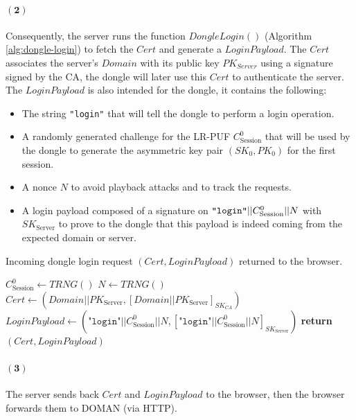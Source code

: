 \paragraph{$\boldsymbol{(2)}$} Consequently, the server runs the function $DongleLogin()$ (Algorithm \ref{alg:dongle-login}) to fetch the $Cert$ and generate a $LoginPayload$. The $Cert$ associates the server's $Domain$ with its public key $PK_{Server}$ using a signature signed by the CA, the dongle will later use this $Cert$ to authenticate the server. The $LoginPayload$ is also intended for the dongle, it contains the following:
\begin{itemize}
    \item The string \verb|"login"| that will tell the dongle to perform a login operation.
    \item A randomly generated challenge for the LR-PUF $C_\text{Session}^0$ that will be used by the dongle to generate the asymmetric key pair $(SK_0,PK_0)$ for the first session.
    \item A nonce $N$ to avoid playback attacks and to track the requests.
    \item A login payload composed of a signature on $\verb|"login"|||C_\text{Session}^0||N$ with $SK_\text{Server}$ to prove to the dongle that this payload is indeed coming from the expected domain or server.
\end{itemize}
\begin{algorithm}[ht!]
\caption{$DongleLogin()$}
\begin{algorithmic}[1]
    \Require Incoming dongle login request
    \Ensure  $(\mathit{Cert}, \mathit{LoginPayload})$ returned to the browser.

    \State $C^0_{\text{Session}} \leftarrow TRNG()$
    \State $N \leftarrow TRNG()$
    \State $Cert \leftarrow (Domain||PK_\text{Server},[Domain||PK_\text{Server}]_{SK_{CA}})$
    \State $\mathit{LoginPayload} \leftarrow
            (\texttt{"login"} || C^0_{\text{Session}} || N,
            [\texttt{"login"} || C^0_{\text{Session}} || N]_{\mathit{SK}_{\text{Server}}})$
    \State \textbf{return} $(\mathit{Cert}, \mathit{LoginPayload})$
\end{algorithmic}
\label{alg:dongle-login}
\end{algorithm}
\paragraph{$\boldsymbol{(3)}$} The server sends back $Cert$ and $LoginPayload$ to the browser, then the browser forwards them to DOMAN (via HTTP).
